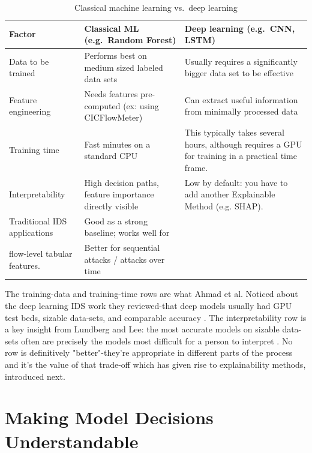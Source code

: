 \begin{table}[H]
  \centering
  \caption{Classical machine learning vs.\ deep learning}
  \label{tab:classical_vs_deep}
  \renewcommand{\arraystretch}{1.4}
  \begin{tabularx}{\textwidth}{lXX}
    \toprule
    \textbf{Factor} & \textbf{Classical ML (e.g.\ Random Forest)} & \textbf{Deep
      learning (e.g.\ CNN, LSTM)} \\
    \midrule
    Data to be trained & Performs best on medium sized labeled data sets &
      Usually requires a significantly bigger data set to be effective \\
    Feature engineering & Needs features pre-computed (ex: using CICFlowMeter) & Can extract useful information from minimally processed data \\
    Training time & Fast minutes on a standard CPU & This typically takes several hours, although requires a GPU for training in a practical time frame. \\
    Interpretability & High decision paths, feature importance directly visible & Low by default: you have to add another Explainable Method (e.g. SHAP). \\
    Traditional IDS applications & Good as a strong baseline; works well for \\
    flow-level tabular features. & Better for sequential attacks / attacks over time \\
    \bottomrule
  \end{tabularx}
\end{table}
 
The training-data and training-time rows are what Ahmad et al. Noticed about the deep learning IDS work they reviewed-that deep models usually had GPU test beds, sizable data-sets, and comparable accuracy \cite{ahmad2021network}. The interpretability row is a key insight from Lundberg and Lee: the most accurate models on sizable data-sets often are precisely the models most difficult for a person to interpret \cite{lundberg2017shap}. No row is definitively "better"-they’re appropriate in different parts of the process and it’s the value of that trade-off which has given rise to explainability methods, introduced next.

\section{Making Model Decisions Understandable}
\label{sec:xai}
 
